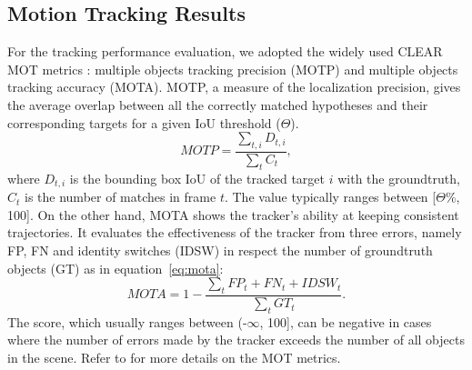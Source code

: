 \documentclass{svjour3}                     \smartqed
\begin{document}
\subsection{Motion Tracking Results}
For the tracking performance evaluation, we adopted the widely used CLEAR MOT metrics \cite{mot:bernardin2008evaluating}: multiple objects tracking precision (MOTP) and multiple objects tracking accuracy (MOTA). 
MOTP, a measure of the localization precision, gives the average overlap between all the correctly matched hypotheses and their corresponding targets for a given IoU threshold ($\Theta$).
\begin{equation}
    MOTP = \frac{\sum_{t,i}D_{t,i}}{\sum_{t}C_t},
    \label{eq:motp}
\end{equation}
where $D_{t,i}$ is the bounding box IoU of the tracked target $i$ with the groundtruth, $C_t$ is the number of matches in frame $t$. The value typically ranges between [$\Theta$\%, 100].
On the other hand, MOTA shows the tracker's ability at keeping consistent trajectories. It evaluates the effectiveness of the tracker from three errors, namely FP, FN and identity switches (IDSW) in respect the number of groundtruth objects (GT) as in equation~\ref{eq:mota}:
\begin{equation}
    MOTA = 1-\frac{\sum_{t}FP_t+FN_t+IDSW_t}{\sum_{t}GT_t}.
    \label{eq:mota}
\end{equation}
The score, which usually ranges between (-$\infty$, 100], can be negative in cases where the number of errors made by the tracker exceeds the number of all objects in the scene. Refer to \cite{mot:bernardin2008evaluating} for more details on the MOT metrics.
\end{document}
